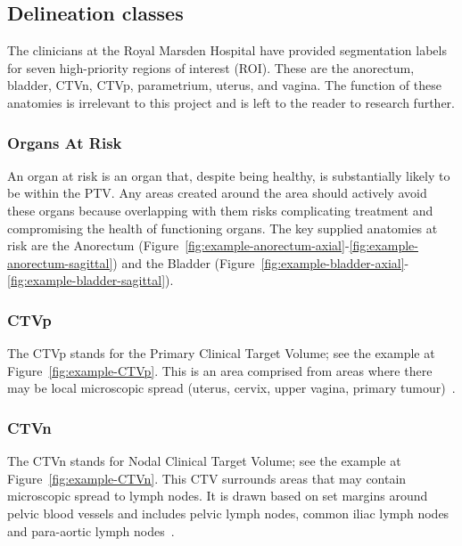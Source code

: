 \documentclass[12pt,twoside]{report}
\begin{document}

\subsection{Delineation classes}\label{sect:delineation-classes}

The clinicians at the Royal Marsden Hospital have provided segmentation labels for seven high-priority regions of interest (ROI). These are the anorectum, bladder, CTVn, CTVp, parametrium, uterus, and vagina. The function of these anatomies is irrelevant to this project and is left to the reader to research further.

\subsubsection{Organs At Risk}\label{sec:data-organs-at-risk}

An organ at risk is an organ that, despite being healthy, is substantially likely to be within the PTV. Any areas created around the area should actively avoid these organs because overlapping with them risks complicating treatment and compromising the health of functioning organs. The key supplied anatomies at risk are the  Anorectum (Figure~\ref{fig:example-anorectum-axial}-\ref{fig:example-anorectum-sagittal}) and the Bladder (Figure~\ref{fig:example-bladder-axial}-\ref{fig:example-bladder-sagittal}).

\subsubsection{CTVp}\label{sec:data-CTVp}

The CTVp stands for the Primary Clinical Target Volume; see the example at Figure~\ref{fig:example-CTVp}. This is an area comprised from areas where there may be local microscopic spread (uterus, cervix, upper vagina, primary tumour)~\cite{AMLART-data}.

\subsubsection{CTVn}\label{sec:data-CTVn}

The CTVn stands for Nodal Clinical Target Volume; see the example at Figure~\ref{fig:example-CTVn}. This CTV surrounds areas that may contain microscopic spread to lymph nodes. It is drawn based on set margins around pelvic blood vessels and includes pelvic lymph nodes, common iliac lymph nodes and para-aortic lymph nodes~\cite{AMLART-data}.
\end{document}
